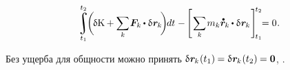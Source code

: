 \begin{otherlanguage}{russian}
\nopagebreak\vspace{-0.25em}
\begin{equation}
\displaystyle \integral\displaylimits_{t_1}^{\raisemath{.12em}{t_2}}
\hspace{-0.4ex}
\biggl( \hspace{-0.25ex} \variation{\kineticenergyinmechanics}
+ \scalebox{.95}[.98]{$ \displaystyle \sum_{\smash{k}} $} \hspace{.16ex} \bm{F}_k \hspace{-0.1ex} \dotp \variation{\hspace{.1ex}\locationvector_{\hspace{-0.1ex}k}} \hspace{-0.4ex} \biggr) \hspace{-0.2ex} dt \hspace{.1ex}
- \hspace{-0.2ex} \left[ \hspace{.2ex} \scalebox{.95}[.98]{$ \displaystyle \sum_{\smash{k}} $} \hspace{.2ex} m_k \mathdotabove{\locationvector}_{\hspace{-0.1ex}k} \hspace{-0.1ex} \dotp \variation{\hspace{.1ex}\locationvector_{\hspace{-0.1ex}k}} \hspace{.16ex} \right]_{\hspace{-0.32ex}t_1}^{\hspace{-0.32ex}t_2}
\hspace{-0.8ex} = 0
\hspace{.1ex} .
\end{equation}

\vspace{-0.16em}\noindent
Без ущерба для общности
можно принять
${\variation{\hspace{.1ex}\locationvector_{\hspace{-0.1ex}k}}\hspace{.1ex}(t_1) \hspace{-0.1ex} = \variation{\hspace{.1ex}\locationvector_{\hspace{-0.1ex}k}}\hspace{.1ex}(t_2) \hspace{-0.1ex} = \zerovector}$,
.


\end{otherlanguage}
